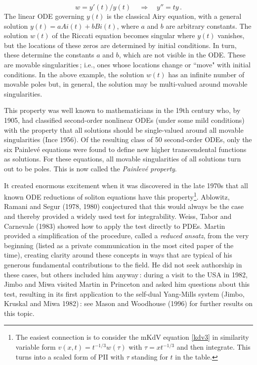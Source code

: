 \documentclass[11pt]{article}
\newcommand{\bel}{\begin{equation}\label}
\newcommand{\ee}{\end{equation}}
\begin{document}
\bel{lin_ricc}
w = y'(t)/y(t)\,\quad\Rightarrow\quad y'' = ty\,.
\ee
The linear ODE governing $y(t)$ is the classical Airy equation, with a general solution $y(t) = a Ai(t) + b Bi(t)$, where 
$a$ and $b$ are arbitrary constants. The solution $w(t)$ of the Riccati equation becomes singular where $y(t)$ vanishes, but 
the locations of these zeros are determined by initial conditions. In turn, these determine the constants $a$ and $b$, which 
are not visible in the ODE. These are movable singularities\,; i.e., ones whose locations change or ``move" with initial conditions. In the above example, the solution $w(t)$ has an infinite number of movable poles but, in general, the solution 
may be multi-valued around movable singularities.
\par\smallskip%
This property was well known to mathematicians in the 19th century who, by 1905, had classified second-order nonlinear ODEs 
(under some mild conditions) with the property that all solutions should be single-valued around all movable singularities 
(Ince 1956). Of the resulting class of 50 second-order ODEs, only the six Painlev\'e equations were found to define new higher transcendental functions as solutions. For these equations, all movable singularities of all solutions turn out to be poles. This is now called the \textit{Painlev\'e property}.
\par\smallskip%
It created enormous excitement when it was discovered in the late 1970s that all known ODE reductions of soliton equations 
have this property\footnote{The easiest connection is to consider the mKdV equation \eqref{kdv3} in similarity variable form 
$v(x,t) = t^{-1/3}w(\tau)$ with $\tau= x t^{-1/3}$ and then integrate. This turns into a scaled form of PII with $\tau$ 
standing for $t$ in the table.}. Ablowitz, Ramani and Segur (1978, 1980) conjectured that this would always be the case and thereby provided a widely used test for integrability. Weiss, Tabor and Carnevale (1983) showed how to apply the test directly to PDEs. Martin provided a simplification of the procedure, called a \textit{reduced ansatz}, from the very beginning (listed 
as a private communication in the most cited paper of the time), creating clarity around these concepts in ways that are 
typical of his generous fundamental contributions to the field. He did not seek authorship in these cases, but others included him anyway\,: during a visit to the USA in 1982, Jimbo and Miwa visited Martin in Princeton and asked him questions about this test, resulting in its first application to the self-dual Yang-Mills system (Jimbo, Kruskal and Miwa 1982)\,: see Mason and Woodhouse (1996) for further results on this topic. 
\end{document}
